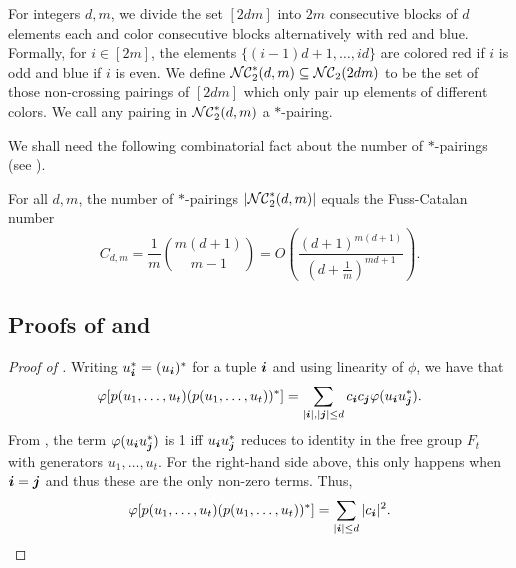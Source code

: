 For integers $d,m$, we divide the set $[2dm]$ into $2m$ consecutive blocks of $d$ elements each and color consecutive blocks alternatively with red and blue. Formally, for $i \in [2m]$, the elements $\{(i-1)d+1,\ldots, id\}$ are colored red if $i$ is odd and blue if $i$ is even. We define $\mathcal{NC}_2^*(d,m) \subseteq \mathcal{NC}_2(2dm)$ to be the set of those non-crossing pairings of $[2dm]$ which only pair up elements of different colors. We call any pairing in $\mathcal{NC}_2^*(d,m)$ a $*$-pairing.

We shall need the following combinatorial fact about the number of $*$-pairings (see \cite[Corollary 3.2]{KS05}).

\begin{lemma}\label{lem:catalan-fuss}
    For all $d, m$, the number of $*$-pairings  $|\mathcal{NC}_2^*(d,m)|$ equals the Fuss-Catalan number
    \[ 
    C_{d,m} = \frac{1}{m}\binom{m(d+1)}{m-1} = O\left(\frac{(d+1)^{m(d+1)}}{\left(d+\frac1m\right)^{md+1}}\right).
    \] 
\end{lemma}




\subsection{Proofs of  and }



\begin{proof}[Proof of ]
    Writing $u^*_{\boldsymbol{i}} = (u_{\boldsymbol{i}})^*$ for a tuple ${\boldsymbol{i}}$ and using linearity of $\phi$, we have that 
    \[ 
    \varphi[p(u_1, \ldots, u_t) (p(u_1, \ldots, u_t))^*] =  \sum_{|{\boldsymbol{i}}|,|{\boldsymbol{j}}| \le d} c_{{\boldsymbol{i}}}c_{{\boldsymbol{j}}} \varphi(u_{{\boldsymbol{i}}}u^*_{{\boldsymbol{j}}}).
    \]
    From , the term $\varphi(u_{{\boldsymbol{i}}}u^*_{{\boldsymbol{j}}})$ is 1 iff $u_{{\boldsymbol{i}}}u^*_{{\boldsymbol{j}}}$ reduces to identity in the free group $F_t$ with generators $u_1, \ldots, u_t$. For the right-hand side above, this only happens when ${\boldsymbol{i}}={\boldsymbol{j}}$ and thus these are the only non-zero terms. Thus, 
    \[ \varphi[p(u_1, \ldots, u_t) (p(u_1, \ldots, u_t))^*] =  \sum_{|{\boldsymbol{i}}| \le d} |c_{{\boldsymbol{i}}}|^2. \qedhere\]
\end{proof}

